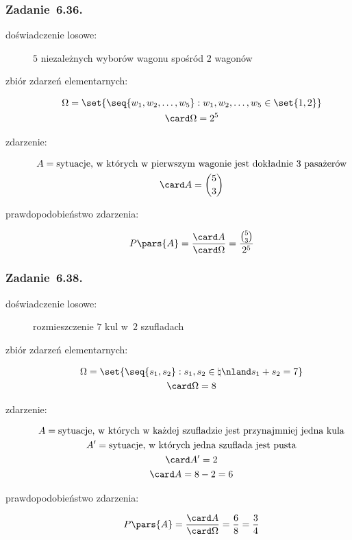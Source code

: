 \subsubsection*{Zadanie~6.36.}
\begin{description}
    \item[doświadczenie losowe:] \(5\) niezależnych wyborów wagonu spośród \(2\) wagonów
    \item[zbiór zdarzeń elementarnych:]
        \begin{gather*}
            \Omega = \set{\seq{w_1, w_2, \ldots, w_5} : w_1, w_2, \ldots, w_5 \in \set{1, 2}}\\
            \card\Omega = 2^5
        \end{gather*}
    \item[zdarzenie:]
        \begin{gather*}
            A = \text{sytuacje, w~których w~pierwszym wagonie jest dokładnie \(3\) pasażerów}\\
            \card A = \binom{5}{3}
        \end{gather*}
    \item[prawdopodobieństwo zdarzenia:]
        \begin{equation*}
            P\pars{A}
                = \frac{\card A}{\card\Omega}
                = \frac{\binom{5}{3}}{2^5}
        \end{equation*}
\end{description}
\subsubsection*{Zadanie~6.38.}
\begin{description}
    \item[doświadczenie losowe:] rozmieszczenie \(7\) kul w~\(2\) szufladach
    \item[zbiór zdarzeń elementarnych:]
        \begin{gather*}
            \Omega = \set{\seq{s_1, s_2} : s_1, s_2 \in \natural \nland s_1 + s_2 = 7}\\
            \card\Omega = 8
        \end{gather*}
    \item[zdarzenie:]
        \begin{gather*}
            A = \text{sytuacje, w~których w~każdej szufladzie jest przynajmniej jedna kula}\\
            A' = \text{sytuacje, w~których jedna szuflada jest pusta}\\
            \card A' = 2\\
            \card A = 8 - 2 = 6\\
        \end{gather*}
    \item[prawdopodobieństwo zdarzenia:]
        \begin{equation*}
            P\pars{A}
                = \frac{\card A}{\card\Omega}
                = \frac{6}{8}
                = \frac{3}{4}
        \end{equation*}
\end{description}
